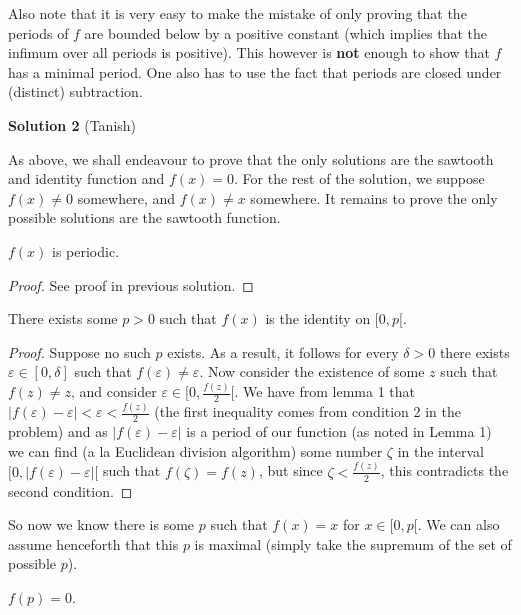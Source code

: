 \bigskip

Also note that it is very easy to make the mistake of only proving that the periods of $f$ are bounded below by a positive constant (which implies that the infimum over all periods is positive). This however is \textbf{not} enough to show that $f$ has a minimal period. One also has to use the fact that periods are closed under (distinct) subtraction.

\newpage

\textbf{Solution 2} (Tanish)

As above, we shall endeavour to prove that the only solutions are the sawtooth and identity function and $f(x) = 0$.
For the rest of the solution, we suppose $f(x) \neq 0$ somewhere, and $f(x) \neq x$ somewhere. It remains to prove the only possible solutions are the sawtooth function.
\begin{lem} 
$f(x)$ is periodic.
\end{lem}
\begin{proof}
See proof in previous solution.
\end{proof}
\begin{lem}
There exists some $p > 0$ such that $f(x)$ is the identity on $[0,p[$.
\end{lem}
\begin{proof}
Suppose no such $p$ exists. As a result, it follows for every $\delta > 0$ there exists $\varepsilon \in [0,\delta]$ such that $f(\varepsilon) \neq \varepsilon$. Now consider the existence of some $z$ such that $f(z) \neq z$, and consider $\varepsilon \in [0, \frac{f(z)}{2}[$. We have from lemma 1 that $|f(\varepsilon) - \varepsilon| < \varepsilon < \frac{f(z)}{2}$ (the first inequality comes from condition 2 in the problem) and as $|f(\varepsilon) - \varepsilon|$ is a period of our function (as noted in Lemma 1) we can find (a la Euclidean division algorithm) some number $\zeta$ in the interval $[0, |f(\varepsilon) - \varepsilon|[$ such that $f(\zeta) = f(z)$, but since $\zeta < \frac{f(z)}{2}$, this contradicts the second condition.
\end{proof}
So now we know there is some $p$ such that $f(x) = x$ for $x \in [0,p[$. We can also assume henceforth that this $p$ is maximal (simply take the supremum of the set of possible $p$).
\begin{lem}
$f(p) = 0$.
\end{lem}
